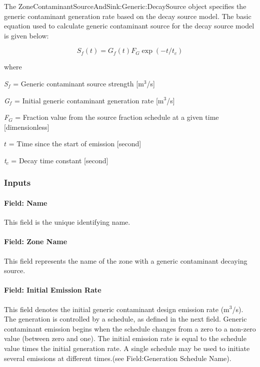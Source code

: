 The ZoneContaminantSourceAndSink:Generic:DecaySource object specifies the generic contaminant generation rate based on the decay source model. The basic equation used to calculate generic contaminant source for the decay source model is given below:

\begin{equation}
{S_f}(t) = {G_f}(t){F_G}\exp ( - t/{t_c})
\end{equation}

where

\emph{S\(_{f}\)} = Generic contaminant source strength {[}m\(^{3}\)/s{]}

\emph{G\(_{f}\)} = Initial generic contaminant generation rate {[}m\(^{3}\)/s{]}

\emph{F\(_{G}\)} = Fraction value from the source fraction schedule at a given time {[}dimensionless{]}

\(t\) = Time since the start of emission {[}second{]}

\emph{t\(_{c}\)} = Decay time constant {[}second{]}

\subsubsection{Inputs}\label{inputs-14-006}

\paragraph{Field: Name}\label{field-name-14-004}

This field is the unique identifying name.

\paragraph{Field: Zone Name}\label{field-zone-name-5-002}

This field represents the name of the zone with a generic contaminant decaying source.

\paragraph{Field: Initial Emission Rate}\label{field-initial-emission-rate}

This field denotes the initial generic contaminant design emission rate (m\(^{3}\)/s). The generation is controlled by a schedule, as defined in the next field. Generic contaminant emission begins when the schedule changes from a zero to a non-zero value (between zero and one). The initial emission rate is equal to the schedule value times the initial generation rate. A single schedule may be used to initiate several emissions at different times.(see Field:Generation Schedule Name).

